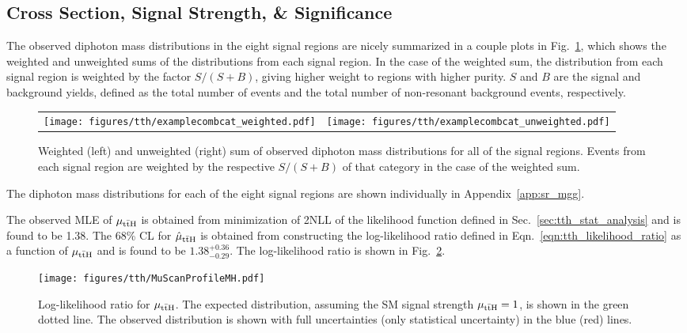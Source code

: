 \subsection{Cross Section, Signal Strength, \& Significance}
The observed diphoton mass distributions in the eight signal regions are nicely summarized in a couple plots in Fig.~\ref{fig:tth_obs_sr_weighted}, which shows the weighted and unweighted sums of the distributions from each signal region.
In the case of the weighted sum, the distribution from each signal region is weighted by the factor $S / (S + B)$, giving higher weight to regions with higher purity.
$S$ and $B$ are the signal and background yields, defined as the total number of \Hgg events and the total number of non-resonant background events, respectively.
\begin{figure} [htbp!]
    \centering
    \begin{tabular} {c c}
        \texttt{[image: figures/tth/examplecombcat\_weighted.pdf]} &
        \texttt{[image: figures/tth/examplecombcat\_unweighted.pdf]}
    \end{tabular}
    \caption{Weighted (left) and unweighted (right) sum of observed diphoton mass distributions for all of the signal regions. Events from each signal region are weighted by the respective $S / (S +B)$ of that category in the case of the weighted sum.}
    \label{fig:tth_obs_sr_weighted}
\end{figure}

The diphoton mass distributions for each of the eight signal regions are shown individually in Appendix~\ref{app:sr_mgg}.

The observed MLE of $\mu_{\mathrm{t\bar{t}H}}$ is obtained from minimization of 2NLL of the likelihood function defined in Sec.~\ref{sec:tth_stat_analysis} and is found to be 1.38.
The 68\% CL for $\hat{\mu}_{\mathrm{t\bar{t}H}}$ is obtained from constructing the log-likelihood ratio defined in Eqn.~\ref{eqn:tth_likelihood_ratio} as a function of $\mu_{\mathrm{t\bar{t}H}}$ and is found to be $1.38^{+0.36}_{-0.29}$.
The log-likelihood ratio is shown in Fig.~\ref{fig:tth_llr}.

\begin{figure} [htbp!]
    \centering
    \texttt{[image: figures/tth/MuScanProfileMH.pdf]}
    \caption{Log-likelihood ratio for $\mu_{\mathrm{t\bar{t}H}}$. The expected distribution, assuming the SM signal strength $\mu_{\mathrm{t\bar{t}H}} = 1$, is shown in the green dotted line. The observed distribution is shown with full uncertainties (only statistical uncertainty) in the blue (red) lines.}
    \label{fig:tth_llr}
\end{figure}

